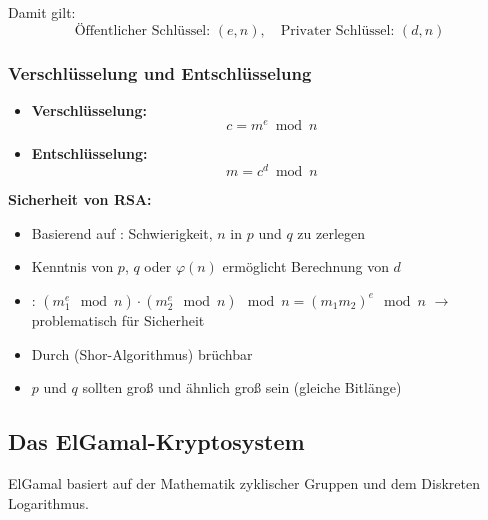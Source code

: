 \documentclass[
../../css_summary.tex,
]
{subfiles}
\begin{document}
\noindent Damit gilt:
\[
   \text{Öffentlicher Schlüssel: } (e, n), \quad \text{Privater Schlüssel: } (d, n)
\]

\subsubsection{Verschlüsselung und Entschlüsselung}

\begin{itemize}
   \item \textbf{Verschlüsselung:}
         \[
            c = m^e \bmod n
         \]
   \item \textbf{Entschlüsselung:}
         \[
            m = c^d \bmod n
         \]
\end{itemize}

\noindent\textbf{Sicherheit von RSA:}
\begin{itemize}
   \item Basierend auf : Schwierigkeit, $n$ in $p$ und $q$ zu zerlegen
   \item Kenntnis von $p$, $q$ oder $\varphi(n)$ ermöglicht Berechnung von $d$
   \item {}: $(m_1^e \mod n) \cdot (m_2^e \mod n) \mod n = (m_1 m_2)^e \mod n$ $\rightarrow$ problematisch für Sicherheit
   \item Durch  (Shor-Algorithmus) brüchbar
   \item $p$ und $q$ sollten groß und ähnlich groß sein (gleiche Bitlänge)
\end{itemize}

\subsection*{Das ElGamal-Kryptosystem}
ElGamal basiert auf der Mathematik zyklischer Gruppen und dem Diskreten Logarithmus.
\end{document}
